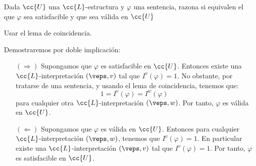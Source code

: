\begin{ejercicio}\label{ej:2.2}
    Dada $\cc{U}$ una $\cc{L}$-estructura y $\varphi$ una sentencia, razona si equivalen el que $\varphi$ sea satisfacible y que sea válida en $\cc{U}$
    \begin{observacion}
        Usar el lema de coincidencia.
    \end{observacion}

    Demostraremos por doble implicación:
    \begin{itemize}
        \item[$(\Rightarrow)$] Supongamos que $\varphi$ es satisfacible en $\cc{U}$. Entonces existe una $\cc{L}$-interpretación $(\veps,v)$ tal que $I^v(\varphi) = 1$. No obstante, por tratarse de una sentencia, y usando el lema de coincidencia, tenemos que:
        \begin{equation*}
            1 = I^v(\varphi) = I^{w}(\varphi)
        \end{equation*}
        para cualquier otra $\cc{L}$-interpretación $(\veps,w)$. Por tanto, $\varphi$ es válida en $\cc{U}$.

        \item[$(\Leftarrow)$] Supongamos que $\varphi$ es válida en $\cc{U}$. Entonces para cualquier $\cc{L}$-interpretación $(\veps,w)$, tenemos que $I^v(\varphi) = 1$. En particular existe una $\cc{L}$-interpretación $(\veps,v)$ tal que $I^v(\varphi) = 1$. Por tanto, $\varphi$ es satisfacible en $\cc{U}$.
    \end{itemize}
\end{ejercicio}

\begin{comment}
\setcounter{ejercicio}{2}
\begin{ejercicio}\label{ej:2.3}
    Usando el Ejercicio~\ref{ej:2.2}, y bajo las mismas hipótesis, prueba que o bien $\varphi$ es válida o bien lo es $\neg \varphi$, pero no se pueden dar las dos posibilidades.
\end{ejercicio}
\end{comment}

\begin{comment}
\setcounter{ejercicio}{3}
\begin{ejercicio}\label{ej:2.4}
    Sea $\cc{U}$ una $\cc{L}$-estructura. Sea $\varphi \in Form(\cc{L})$. Si $x_1, \ldots, x_n$ son todas las variables de $\varphi$ con alguna ocurrencia libre, entonces equivalen:
    \begin{enumerate}
        \item $\varphi$ es válida en $\cc{U}$,
        \item $\forall x_1 \ldots \forall x_n \varphi$ es satisfacible en $\cc{U}$,
        \item $\forall x_1 \ldots \forall x_n \varphi$ es válida en $\cc{U}$.
    \end{enumerate}
\end{ejercicio}
\end{comment}

